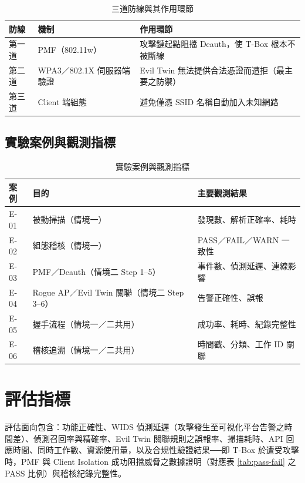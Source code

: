 \documentclass[12pt,a4paper,oneside]{report}
\begin{document}
\begin{table}[htbp]
\centering
\caption{三道防線與其作用環節}
\label{tab:defense-layers}
\begin{tabular}{p{}p{}p{}}
\toprule
防線 & 機制 & 作用環節 \\
\midrule
第一道 & PMF（802.11w） & 攻擊鏈起點阻擋 Deauth，使 T-Box 根本不被斷線 \\
第二道 & WPA3／802.1X 伺服器端驗證 & Evil Twin 無法提供合法憑證而遭拒（最主要之防禦） \\
第三道 & Client 端組態 & 避免僅憑 SSID 名稱自動加入未知網路 \\
\bottomrule
\end{tabular}
\end{table}

\subsection{實驗案例與觀測指標}
\begin{table}[htbp]
\centering
\caption{實驗案例與觀測指標}
\begin{tabular}{p{}p{}p{}}
\toprule
案例 & 目的 & 主要觀測結果 \\
\midrule
E-01 & 被動掃描（情境一） & 發現數、解析正確率、耗時 \\
E-02 & 組態稽核（情境一） & PASS／FAIL／WARN 一致性 \\
E-03 & PMF／Deauth（情境二 Step 1--5） & 事件數、偵測延遲、連線影響 \\
E-04 & Rogue AP／Evil Twin 關聯（情境二 Step 3--6） & 告警正確性、誤報 \\
E-05 & 握手流程（情境一／二共用） & 成功率、耗時、紀錄完整性 \\
E-06 & 稽核追溯（情境一／二共用） & 時間戳、分類、工作 ID 關聯 \\
\bottomrule
\end{tabular}
\end{table}

\section{評估指標}
評估面向包含：功能正確性、WIDS 偵測延遲（攻擊發生至可視化平台告警之時間差）、偵測召回率與精確率、Evil Twin 關聯規則之誤報率、掃描耗時、API 回應時間、同時工作數、資源使用量，以及合規性驗證結果──即 T-Box 於遭受攻擊時，PMF 與 Client Isolation 成功阻擋威脅之數據證明（對應表 \ref{tab:pass-fail} 之 PASS 比例）與稽核紀錄完整性。
\end{document}
